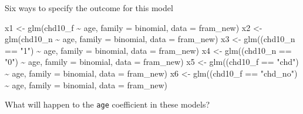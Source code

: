 \documentclass[
  ignorenonframetext,
]{beamer}
\newenvironment{Shaded}{\begin{snugshade}}{\end{snugshade}}
\newcommand{\AttributeTok}[1]{\textcolor[rgb]{0.77,0.63,0.00}{#1}}
\newcommand{\FunctionTok}[1]{\textcolor[rgb]{0.00,0.00,0.00}{#1}}
\newcommand{\NormalTok}[1]{#1}
\newcommand{\OtherTok}[1]{\textcolor[rgb]{0.56,0.35,0.01}{#1}}
\newcommand{\SpecialCharTok}[1]{\textcolor[rgb]{0.00,0.00,0.00}{#1}}
\newcommand{\StringTok}[1]{\textcolor[rgb]{0.31,0.60,0.02}{#1}}
\begin{document}
\begin{frame}[fragile]{Six ways to specify the outcome for this model}
\protect\hypertarget{six-ways-to-specify-the-outcome-for-this-model}{}
\begin{Shaded}
\begin{Highlighting}[]
\NormalTok{x1 }\OtherTok{\textless{}{-}} \FunctionTok{glm}\NormalTok{(chd10\_f }\SpecialCharTok{\textasciitilde{}}\NormalTok{ age, }
          \AttributeTok{family =}\NormalTok{ binomial, }\AttributeTok{data =}\NormalTok{ fram\_new)}
\NormalTok{x2 }\OtherTok{\textless{}{-}} \FunctionTok{glm}\NormalTok{(chd10\_n }\SpecialCharTok{\textasciitilde{}}\NormalTok{ age, }
          \AttributeTok{family =}\NormalTok{ binomial, }\AttributeTok{data =}\NormalTok{ fram\_new)}
\NormalTok{x3 }\OtherTok{\textless{}{-}} \FunctionTok{glm}\NormalTok{((chd10\_n }\SpecialCharTok{==} \StringTok{"1"}\NormalTok{) }\SpecialCharTok{\textasciitilde{}}\NormalTok{ age, }
          \AttributeTok{family =}\NormalTok{ binomial, }\AttributeTok{data =}\NormalTok{ fram\_new)}
\NormalTok{x4 }\OtherTok{\textless{}{-}} \FunctionTok{glm}\NormalTok{((chd10\_n }\SpecialCharTok{==} \StringTok{"0"}\NormalTok{) }\SpecialCharTok{\textasciitilde{}}\NormalTok{ age, }
          \AttributeTok{family =}\NormalTok{ binomial, }\AttributeTok{data =}\NormalTok{ fram\_new)}
\NormalTok{x5 }\OtherTok{\textless{}{-}} \FunctionTok{glm}\NormalTok{((chd10\_f }\SpecialCharTok{==} \StringTok{"chd"}\NormalTok{) }\SpecialCharTok{\textasciitilde{}}\NormalTok{ age, }
          \AttributeTok{family =}\NormalTok{ binomial, }\AttributeTok{data =}\NormalTok{ fram\_new)}
\NormalTok{x6 }\OtherTok{\textless{}{-}} \FunctionTok{glm}\NormalTok{((chd10\_f }\SpecialCharTok{==} \StringTok{"chd\_no"}\NormalTok{) }\SpecialCharTok{\textasciitilde{}}\NormalTok{ age, }
          \AttributeTok{family =}\NormalTok{ binomial, }\AttributeTok{data =}\NormalTok{ fram\_new)}
\end{Highlighting}
\end{Shaded}

What will happen to the \texttt{age} coefficient in these models?
\end{frame}
\end{document}
